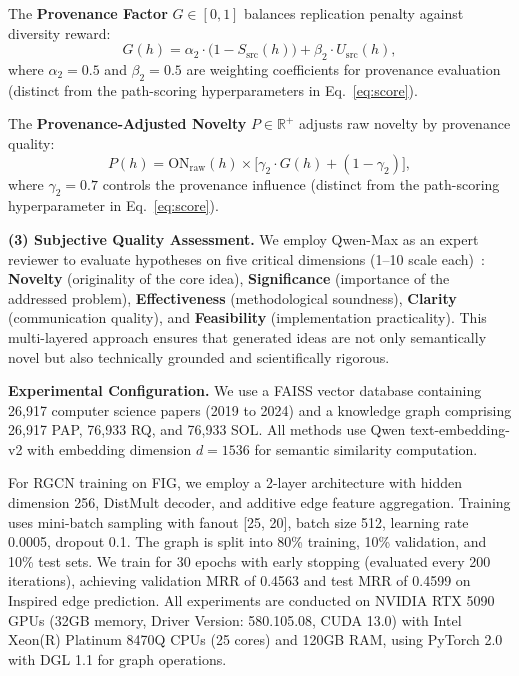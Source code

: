 \documentclass[runningheads]{llncs}
\begin{document}
The \textbf{Provenance Factor} $G \in [0, 1]$ balances replication penalty against diversity reward:
\begin{equation}
    G(h) = \alpha_2 \cdot \big(1 - S_{\text{src}}(h)\big) + \beta_2 \cdot U_{\text{src}}(h),
    \label{eq:provenance_factor}
\end{equation}
where $\alpha_2 = 0.5$ and $\beta_2 = 0.5$ are weighting coefficients for provenance evaluation (distinct from the path-scoring hyperparameters in Eq.~\ref{eq:score}).

The \textbf{Provenance-Adjusted Novelty} $P \in \mathbb{R}^+$ adjusts raw novelty by provenance quality:
\begin{equation}
   P(h) = \text{ON}_{\text{raw}}(h) \times \big[\gamma_2 \cdot G(h) + (1 - \gamma_2)\big],
   \label{eq:p_score}
\end{equation}
where $\gamma_2 = 0.7$ controls the provenance influence (distinct from the path-scoring hyperparameter in Eq.~\ref{eq:score}).

\textbf{(3) Subjective Quality Assessment.} We employ Qwen-Max as an expert reviewer to evaluate hypotheses on five critical dimensions (1--10 scale each)~\cite{gu2024llm,siyang2024novel}: \textbf{Novelty} (originality of the core idea), \textbf{Significance} (importance of the addressed problem), \textbf{Effectiveness} (methodological soundness), \textbf{Clarity} (communication quality), and \textbf{Feasibility} (implementation practicality). This multi-layered approach ensures that generated ideas are not only semantically novel but also technically grounded and scientifically rigorous.

\textbf{Experimental Configuration.} We use a FAISS vector database containing 26,917 computer science papers (2019 to 2024) and a knowledge graph comprising 26,917 PAP, 76,933 RQ, and 76,933 SOL. All methods use Qwen text-embedding-v2 with embedding dimension $d=1536$ for semantic similarity computation.

For RGCN training on FIG, we employ a 2-layer architecture with hidden dimension 256, DistMult decoder, and additive edge feature aggregation. Training uses mini-batch sampling with fanout [25, 20], batch size 512, learning rate 0.0005, dropout 0.1. The graph is split into 80\% training, 10\% validation, and 10\% test sets. We train for 30 epochs with early stopping (evaluated every 200 iterations), achieving validation MRR of 0.4563 and test MRR of 0.4599 on Inspired edge prediction. All experiments are conducted on NVIDIA RTX 5090 GPUs (32GB memory, Driver Version: 580.105.08, CUDA 13.0) with Intel Xeon(R) Platinum 8470Q CPUs (25 cores) and 120GB RAM, using PyTorch 2.0 with DGL 1.1 for graph operations.
\end{document}

